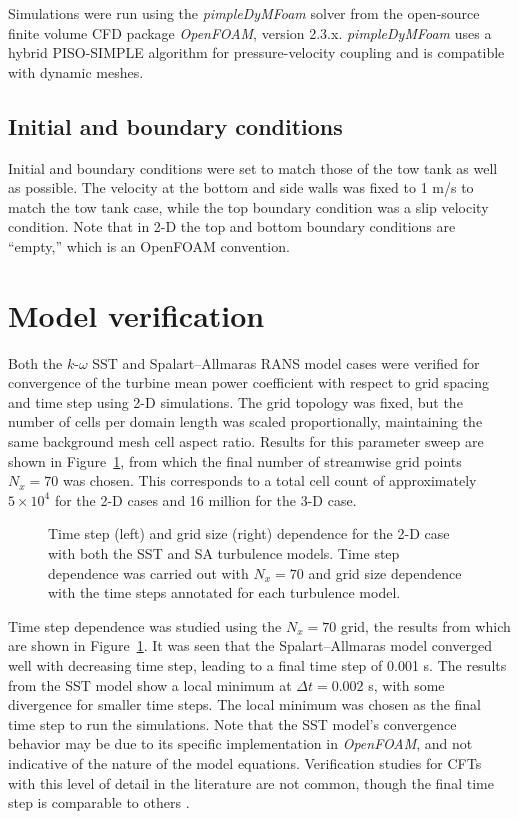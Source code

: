 Simulations were run using the \textit{pimpleDyMFoam} solver from the
open-source finite volume CFD package \textit{OpenFOAM}, version 2.3.x.
\textit{pimpleDyMFoam} uses a hybrid PISO-SIMPLE algorithm for pressure-velocity
coupling and is compatible with dynamic meshes.

\subsection{Initial and boundary conditions}

Initial and boundary conditions were set to match those of the tow tank as well
as possible. The velocity at the bottom and side walls was fixed to 1 m/s to
match the tow tank case, while the top boundary condition was a slip velocity
condition. Note that in 2-D the top and bottom boundary conditions are
``empty,'' which is an OpenFOAM convention.


\section{Model verification}

Both the $k$-$\omega$ SST and Spalart--Allmaras RANS model cases were verified
for convergence of the turbine mean power coefficient with respect to grid
spacing and time step using 2-D simulations. The grid topology was fixed, but
the number of cells per domain length was scaled proportionally, maintaining the
same background mesh cell aspect ratio. Results for this parameter sweep are
shown in Figure~\ref{fig:verification}, from which the final number of
streamwise grid points $N_x = 70$ was chosen. This corresponds to a total cell
count of approximately $5 \times 10^4$ for the 2-D cases and 16 million for the
3-D case.

\begin{figure}[ht]
    \centering


    \caption{Time step (left) and grid size (right) dependence for the 2-D case
        with both the SST and SA turbulence models. Time step dependence was carried
        out with $N_x=70$ and grid size dependence with the time steps annotated for
        each turbulence model.}

    \label{fig:verification}
\end{figure}

Time step dependence was studied using the $N_x=70$ grid, the results from which
are shown in Figure~\ref{fig:verification}. It was seen that the
Spalart--Allmaras model converged well with decreasing time step, leading to a
final time step of 0.001 s. The results from the SST model show a local minimum
at $\Delta t = 0.002$ s, with some divergence for smaller time steps. The local
minimum was chosen as the final time step to run the simulations. Note that the
SST model's convergence behavior may be due to its specific implementation in
\textit{OpenFOAM}, and not indicative of the nature of the model equations.
Verification studies for CFTs with this level of detail in the literature are
not common, though the final time step is comparable to others
\cite{Balduzzi2016}.


